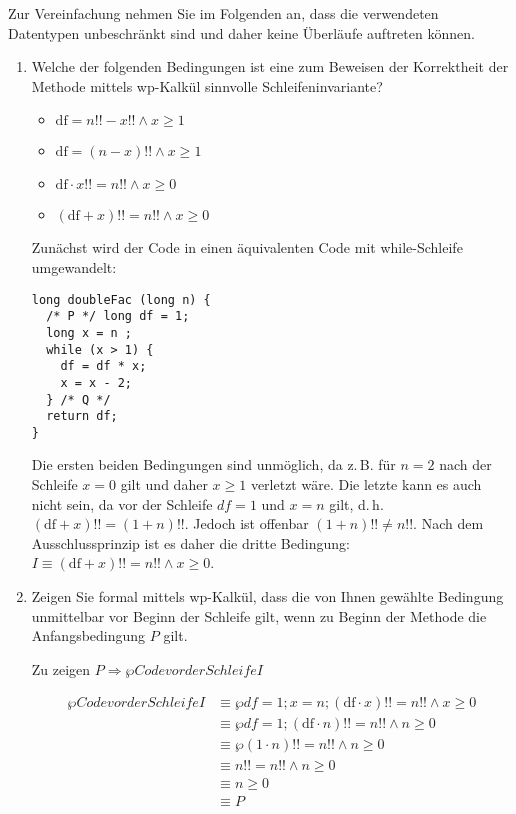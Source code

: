\documentclass{lehramt-informatik-aufgabe}
\begin{document}
\noindent
Zur Vereinfachung nehmen Sie im Folgenden an, dass die verwendeten
Datentypen unbeschränkt sind und daher keine Überläufe auftreten können.

\begin{enumerate}


\item Welche der folgenden Bedingungen ist eine zum Beweisen der
Korrektheit der Methode mittels wp-Kalkül sinnvolle Schleifeninvariante?

\begin{itemize}
\item $\text{df} = n!! − x!! \land x \geq 1$
\item $\text{df} = (n − x)!! \land x \geq 1$
\item $\text{df} \cdot x!! = n!! \land x \geq 0$
\item $(\text{df} + x)!! = n!! \land x \geq 0$
\end{itemize}

\begin{antwort}
Zunächst wird der Code in einen äquivalenten Code mit while-Schleife
umgewandelt:

\begin{verbatim}
long doubleFac (long n) {
  /* P */ long df = 1;
  long x = n ;
  while (x > 1) {
    df = df * x;
    x = x - 2;
  } /* Q */
  return df;
}
\end{verbatim}

Die ersten beiden Bedingungen sind unmöglich, da z.\,B. für $n = 2$ nach
der Schleife $x = 0$ gilt und daher $x \geq 1$ verletzt wäre. Die letzte
kann es auch nicht sein, da vor der Schleife $df = 1$ und $x = n$ gilt,
d.\,h. $(\text{df} + x)!! = (1 + n)!!$. Jedoch ist offenbar $(1 + n)!!
\not = n!!$. Nach dem Ausschlussprinzip ist es daher die dritte
Bedingung: $I \equiv (\text{df} + x)!! = n!! \land x \geq 0$.

\end{antwort}

\item Zeigen Sie formal mittels wp-Kalkül, dass die von Ihnen gewählte
Bedingung unmittelbar vor Beginn der Schleife gilt, wenn zu Beginn der
Methode die Anfangsbedingung $P$ gilt.

\begin{antwort}
Zu zeigen $P \Rightarrow \wp{Code vor der Schleife}{I}$

\begin{align*}
\wp{Code vor der Schleife}{I}
& \equiv \wp{df = 1; x = n;}{(\text{df} \cdot x)!! = n!! \land x \geq 0} \\
& \equiv \wp{df = 1;}{(\text{df} \cdot n)!! = n!! \land n \geq 0} \\
& \equiv \wp{}{(1 \cdot n)!! = n!! \land n \geq 0} \\
& \equiv n!! = n!! \land n \geq 0 \\
& \equiv n \geq 0 \\
& \equiv P \\
\end{align*}


\end{antwort}
\end{enumerate}
\end{document}
